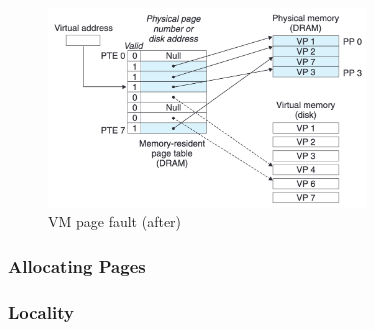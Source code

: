 \documentclass[12pt]{article}
\begin{document}
\begin{figure}[H]
    \centering
    \includegraphics[width=0.75\textwidth]{graphics/Figure 4.7.png}
    \caption{VM page fault (after)}
    \label{fig:47}
\end{figure}

\subsubsection*{Allocating Pages}



\subsubsection*{Locality}
\end{document}
